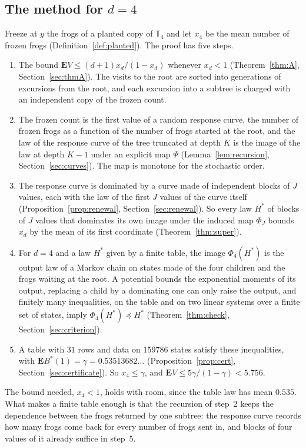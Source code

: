 \documentclass[11pt]{amsart}
\theoremstyle{definition}
\numberwithin{equation}{section}
\newcommand{\T}{\mathbb{T}}
\newcommand{\E}{\mathbf{E}}
\newcommand{\cst}{\gamma}
\newcommand{\stle}{\preceq}
\begin{document}
\subsection*{The method for $d=4$}
Freeze at $y$ the frogs of a planted copy of $\T_4$ and let $x_4$ be the mean number of frozen frogs (Definition~\ref{def:planted}). The proof has five steps.
\begin{enumerate}
\item The bound $\E V\le(d+1)x_d/(1-x_d)$ whenever $x_d<1$ (Theorem~\ref{thm:A}, Section~\ref{sec:thmA}). The visits to the root are sorted into generations of excursions from the root, and each excursion into a subtree is charged with an independent copy of the frozen count.
\item The frozen count is the first value of a random response curve, the number of frozen frogs as a function of the number of frogs started at the root, and the law of the response curve of the tree truncated at depth $K$ is the image of the law at depth $K-1$ under an explicit map $\Psi$ (Lemma~\ref{lem:recursion}, Section~\ref{sec:curves}). The map is monotone for the stochastic order.
\item The response curve is dominated by a curve made of independent blocks of $J$ values, each with the law of the first $J$ values of the curve itself (Proposition~\ref{prop:renewal}, Section~\ref{sec:renewal}). So every law $H^*$ of blocks of $J$ values that dominates its own image under the induced map $\Phi_J$ bounds $x_d$ by the mean of its first coordinate (Theorem~\ref{thm:super}).
\item For $d=4$ and a law $H^*$ given by a finite table, the image $\Phi_4(H^*)$ is the output law of a Markov chain on states made of the four children and the frogs waiting at the root. A potential bounds the exponential moments of its output, replacing a child by a dominating one can only raise the output, and finitely many inequalities, on the table and on two linear systems over a finite set of states, imply $\Phi_4(H^*)\stle H^*$ (Theorem~\ref{thm:check}, Section~\ref{sec:criterion}).
\item A table with $31$ rows and data on $159786$ states satisfy these inequalities, with $\E B^*(1)=\cst=0.53513682\ldots$ (Proposition~\ref{prop:cert}, Section~\ref{sec:certificate}). So $x_4\le\cst$, and $\E V\le5\cst/(1-\cst)<5.756$.
\end{enumerate}
The bound needed, $x_4<1$, holds with room, since the table law has mean $0.535$. What makes a finite table enough is that the recursion of step~2 keeps the dependence between the frogs returned by one subtree: the response curve records how many frogs come back for every number of frogs sent in, and blocks of four values of it already suffice in step~5.
\end{document}

